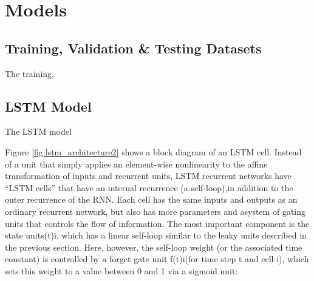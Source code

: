 \documentclass [MS] {uclathes}
\begin{document}
\chapter{Models}







\section{Training, Validation \& Testing Datasets}
The training,

\section{LSTM Model}
The LSTM model 

Figure \ref{fig:lstm_architecture2} shows a block diagram of an LSTM cell. Instead of a unit that simply applies an element-wise nonlinearity to the aﬃne transformation of inputs and recurrent units, LSTM recurrent networks have “LSTM cells” that have an internal recurrence (a self-loop),in addition to the outer recurrence of the RNN. Each cell has the same inputs and outputs as an ordinary recurrent network, but also has more parameters and asystem of gating units that controls the ﬂow of information. The most important component is the state units(t)i, which has a linear self-loop similar to the leaky units described in the previous section. Here, however, the self-loop weight (or the associated time constant) is controlled by a forget gate unit f(t)i(for time step t and cell i), which sets this weight to a value between 0 and 1 via a sigmoid unit:
\end{document}
